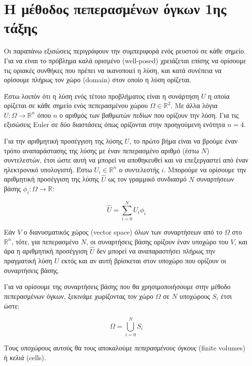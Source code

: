 \section{Η μέθοδος πεπερασμένων όγκων 1ης τάξης}
\label{seq:fvm-mol}

Οι παραπάνω εξισώσεις περιγράφουν την συμπεριφορά ενός ρευστού σε κάθε σημείο.
Για να είναι το πρόβλημα καλά ορισμένο (well-posed) χρειάζεται επίσης να ορίσουμε τις οριακές συνθήκες που πρέπει να ικανοποιεί η λύση, και κατά συνέπεια να ορίσουμε πλήρως τον χώρο (domain) στον οποίο η λύση ορίζεται.

Έστω λοιπόν ότι η λύση ενός τέτοιο προβλήματος είναι η συνάρτηση $U$ η οποία ορίζεται σε κάθε σημείο ενός πεπερασμένου χώρου $\Omega \in \mathbb{R}^2$.
Με άλλα λόγια $U : \Omega \rightarrow \mathbb{R}^n$ όπου $n$ ο αριθμός των βαθμωτών πεδίων που ορίζουν την λύση.
Για τις εξισώσεις Euler σε δύο διαστάσεις όπως ορίζονται στην προηγούμενη ενότητα $n = 4$.

Για την αριθμητική προσέγγιση της λύσης $U$, το πρώτο βήμα είναι να βρούμε έναν τρόπο αναπαράστασης της λύσης με έναν πεπερασμένο αριθμό (έστω $N$) συντελεστών, έτσι ώστε αυτή να μπορεί να αποθηκευθεί και να επεξεργαστεί από έναν ηλεκτρονικό υπολογιστή.
Έστω $U_i \in \mathbb{R}^n$ ο συντελεστής $i$.
Μπορούμε να ορίσουμε την αριθμητική προσέγγιση της λύσης $\hat{U}$ ως τον γραμμικό συνδιασμό $N$ συναρτήσεων βάσης $\phi_i : \Omega \rightarrow \mathbb{R}$:

\begin{equation}
    \hat{U} = \sum_{i = 0}^{N} U_i \phi_i
\end{equation}

Εάν $V$ ο διανυσματικός χώρος (vector space) όλων των συναρτήσεων από το $\Omega$ στο $\mathbb{R}^n$, τότε, για πεπερασμένο $N$, οι συναρτήσεις βάσης ορίζουν έναν υποχώρο του $V$, και άρα η αριθμητική προσέγγιση $\hat{U}$ δεν μπορεί να αναπαραστήσει πλήρως την πραγματική λύση $U$ εκτός και αν αυτή βρίσκεται στον υποχώρο που ορίζουν οι συναρτήσεις βάσης.

Για να ορίσουμε της συναρτήσεις βάσης που θα χρησιμοποιήσουμε στην μέθοδο πεπερασμένων όγκων, ξεκινάμε χωρίζοντας τον χώρο $\Omega$ σε $N$ υποχώρους $S_i$ έτσι ώστε:

\begin{equation}
    \Omega = \bigcup_{i = 0}^{N} S_i
\end{equation}

Τους υποχώρους αυτούς θα τους αποκαλούμε \emph{πεπερασμένους όγκους} (finite volumes) ή \emph{κελιά} (cells).

